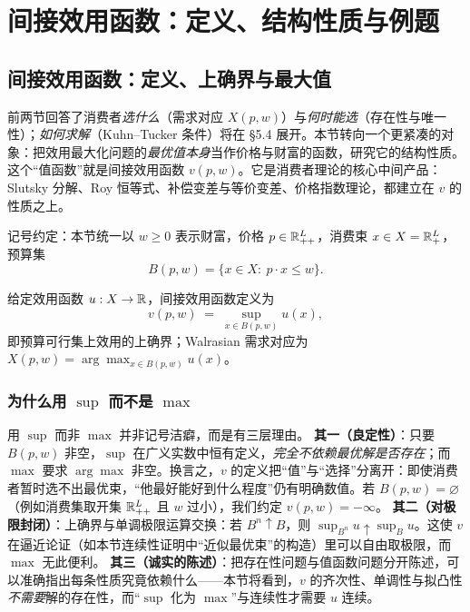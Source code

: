 \section{间接效用函数：定义、结构性质与例题}

\subsection{间接效用函数：定义、上确界与最大值}

前两节回答了消费者\emph{选什么}（需求对应 $X(p,w)$）与\emph{何时能选}（存在性与唯一性）；\emph{如何求解}（Kuhn--Tucker 条件）将在 \S 5.4 展开。本节转向一个更紧凑的对象：把效用最大化问题的\emph{最优值本身}当作价格与财富的函数，研究它的结构性质。这个“值函数”就是间接效用函数 $v(p,w)$。它是消费者理论的核心中间产品：Slutsky 分解、Roy 恒等式、补偿变差与等价变差、价格指数理论，都建立在 $v$ 的性质之上。

记号约定：本节统一以 $w\ge 0$ 表示财富，价格 $p\in\mathbb{R}^L_{++}$，消费束 $x\in X=\mathbb{R}^L_+$，预算集
\[
B(p,w)=\{x\in X:\ p\cdot x\le w\}.
\]

\begin{definition}[间接效用函数]
\label{def:v}
给定效用函数 $u:X\to\mathbb{R}$，间接效用函数定义为
\[
v(p,w)\;=\;\sup_{x\in B(p,w)}u(x),
\]
即预算可行集上效用的上确界；Walrasian 需求对应为 $X(p,w)=\arg\max_{x\in B(p,w)}u(x)$。
\end{definition}

\subsubsection{为什么用 \texorpdfstring{$\sup$}{sup} 而不是 \texorpdfstring{$\max$}{max}}

\begin{remark}[上确界的三重严格性]
用 $\sup$ 而非 $\max$ 并非记号洁癖，而是有三层理由。
\textbf{其一（良定性）}：只要 $B(p,w)$ 非空，$\sup$ 在广义实数中恒有定义，\emph{完全不依赖最优解是否存在}；而 $\max$ 要求 $\arg\max$ 非空。换言之，$v$ 的定义把“值”与“选择”分离开：即使消费者暂时选不出最优束，“他最好能好到什么程度”仍有明确数值。若 $B(p,w)=\varnothing$（例如消费集取开集 $\mathbb{R}^L_{++}$ 且 $w$ 过小），我们约定 $v(p,w)=-\infty$。
\textbf{其二（对极限封闭）}：上确界与单调极限运算交换：若 $B^n\uparrow B$，则 $\sup_{B^n}u\uparrow\sup_Bu$。这使 $v$ 在逼近论证（如本节连续性证明中“近似最优束”的构造）里可以自由取极限，而 $\max$ 无此便利。
\textbf{其三（诚实的陈述）}：把存在性问题与值函数问题分开陈述，可以准确指出每条性质究竟依赖什么——本节将看到，$v$ 的齐次性、单调性与拟凸性\emph{不需要}解的存在性，而“$\sup$ 化为 $\max$”与连续性才需要 $u$ 连续。
\end{remark}

